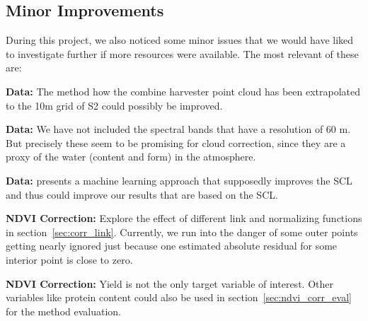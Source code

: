 {    \subsection{Minor Improvements}
        During this project, we also noticed some minor issues that we would have liked to investigate further if more resources were available. The most relevant of these are:
        \begin{Nitemize}
            \item \textbf{Data:}
            The method how the combine harvester point cloud has been extrapolated to the 10m grid of S2 could possibly be improved.
            \item \textbf{Data:}
            We have not included the spectral bands that have a resolution of 60 m. But precisely these seem to be promising for cloud correction, since they are a proxy of the water (content and form) in the atmosphere.
            \item \textbf{Data:}
            \cite{raiyaniSentinel2ImageScene2021} presents a machine learning approach that supposedly improves the SCL and thus could improve our results that are based on the SCL.
            \item \textbf{NDVI Correction:}
            Explore the effect of different link and normalizing functions %
            in section~\ref{sec:corr_link}. Currently, we run into the danger of some outer points getting nearly ignored just because one estimated absolute residual for some interior point is close to zero.
            \item \textbf{NDVI Correction:}
            Yield is not the only target variable of interest. Other variables like protein content could also be used in section~\ref{sec:ndvi_corr_eval} for the method evaluation. 
        \end{Nitemize}
}


